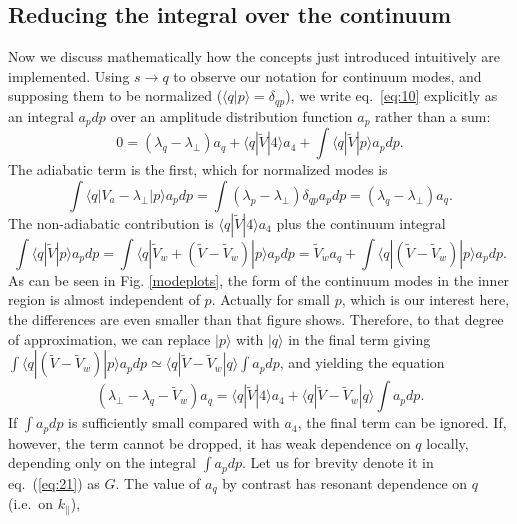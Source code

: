 \documentclass[12pt]{article}
\def\ket#1{|#1\rangle}
\def\bra#1{\langle#1}
\begin{document}
\subsection{Reducing the integral over the continuum}
\label{reducing}
Now we discuss mathematically how the concepts just introduced
intuitively are implemented.  Using $s\to q$ to observe our notation
for continuum modes, and supposing them to be normalized
($\bra{q}\ket{p}=\delta_{qp}$), we write eq.\ \ref{eq:10} explicitly
as an integral $a_pdp$ over an amplitude distribution function $a_p$
rather than a sum:
\begin{equation}
  \label{continw}
  0=(\lambda_q-\lambda_\perp)a_q+\bra{q}|\tilde{V}\ket{4}a_4
  +\int\bra{q}|\tilde{V}\ket{p}a_pdp.
\end{equation}
The adiabatic term is the first, which for normalized modes is
\begin{equation}
  \label{eq:contadiab}
  \int\bra{q}|V_a-\lambda_\perp\ket{p}a_pdp = \int
  (\lambda_p-\lambda_\perp)\delta_{qp}a_pdp = (\lambda_q-\lambda_\perp)a_q.
\end{equation}
The non-adiabatic contribution is $\bra{q}|\tilde{V}\ket{4}a_4$ plus the
continuum integral
\begin{equation}
  \label{eq:18}
  \int \bra{q}|\tilde{V}\ket{p}a_pdp=\int\bra{q}|\tilde{V}_{w}+(\tilde{V}-\tilde{V}_{w})\ket{p}a_pdp
  =\tilde{V}_{w}a_q +\int\bra{q}|(\tilde{V}-\tilde{V}_{w})\ket{p}a_pdp.
\end{equation}
As can be seen in Fig. \ref{modeplots}, the form of the continuum
modes in the inner region is almost independent of $p$. Actually for
small $p$, which is our interest here, the differences are even
smaller than that figure shows. Therefore, to that degree of
approximation, we can replace $\ket{p}$ with $\ket{q}$ in the final
term giving $\int\bra{q}|(\tilde{V}-\tilde{V}_{w})\ket{p}a_pdp\simeq
\bra{q}|\tilde{V}-\tilde{V}_{w}\ket{q}\int a_pdp$, and yielding the
equation
\begin{equation}
  \label{eq:21}
  (\lambda_\perp-\lambda_q-\tilde V_w)a_q= \bra{q}|\tilde{V}\ket{4}a_4
  +\bra{q}|\tilde{V}-\tilde{V}_{w}\ket{q}\int a_pdp.
\end{equation}
If $\int a_pdp$ is sufficiently small compared with $a_4$, the final
term can be ignored.  If, however, the term cannot be dropped, it has
weak dependence on $q$ locally, depending only on the integral
$\int a_pdp$. Let us for brevity denote it in eq.\ (\ref{eq:21}) as
$G$. The value of $a_q$ by contrast has resonant dependence on $q$
(i.e.\ on $k_\parallel$),
\end{document}
